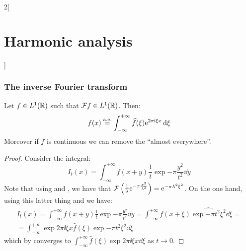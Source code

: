 \documentclass[../../../main_math.tex]{subfiles}
\begin{document}
\begin{multicols}{2}[\section{Harmonic analysis}]
  \subsubsection{The inverse Fourier transform}
  \begin{theorem}\label{HA:inverseFT}
    Let $f\in L^1(\mathbb{R})$ such that $\mathcal{F} f\in L^1(\mathbb{R})$. Then:
    $$f(x)\overset{\text{a.e.}}{=}\int_{-\infty}^{+\infty}\widehat{f}(\xi)\mathrm{e}^{2\pi \mathrm{i} \xi x}\dd{\xi}$$
    Moreover if $f$ is continuous we can remove the ``almost everywhere''.
  \end{theorem}
  \begin{proof}
    Consider the integral: $$I_t(x)=\int_{-\infty}^{+\infty}f(x+y)\frac{1}{t}\exp{-\pi \frac{y^2}{t^2}}\dd{y}$$
    Note that using  and , we have that $\mathcal{F} \left(\frac{1}{\lambda}\mathrm{e}^{-\pi \frac{x^2}{\lambda^2}}\right)=\mathrm{e}^{-\pi\lambda^2\xi^2}$. On the one hand, using this latter thing and  we have:
    \begin{multline*}
      I_t(x)=\int_{-\infty}^{+\infty}f(x+y)\frac{1}{t}\exp{-\pi \frac{y^2}{t^2}}\dd{y}=\int_{-\infty}^{+\infty}f(x+\xi)\widehat{\exp{-\pi t^2\xi^2}}\dd{\xi}=\\
      =\int_{-\infty}^{+\infty}\exp{2\pi\ii\xi x}\widehat{f}(\xi)\exp{-\pi t^2\xi^2}\dd{\xi}
    \end{multline*}
    which by  converges to $\int_{-\infty}^{+\infty}\widehat{f}(\xi)\exp{2\pi \ii \xi x}\dd{\xi}$ as $t\to 0$.


\end{proof}
\end{multicols}
\end{document}
